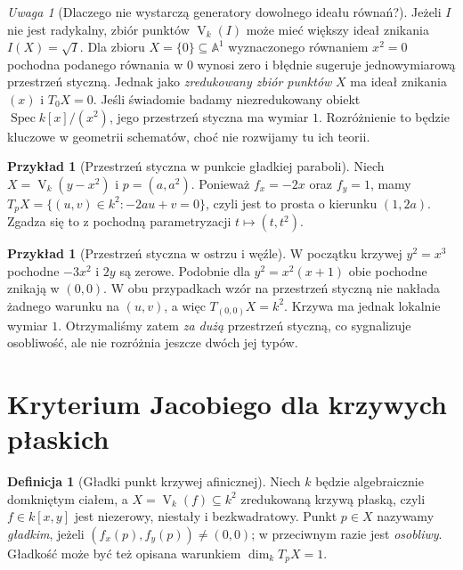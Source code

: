 \documentclass[11pt,a4paper,openany]{report}
\numberwithin{equation}{section}
\theoremstyle{plain}
\theoremstyle{definition}
\newtheorem{definicja}[twierdzenie]{Definicja}
\newtheorem{przyklad}[twierdzenie]{Przykład}
\theoremstyle{remark}
\newtheorem{uwaga}[twierdzenie]{Uwaga}
\newcommand{\A}{\mathbb A}
\newcommand{\V}{\operatorname V}
\begin{document}
\begin{uwaga}[Dlaczego nie wystarczą generatory dowolnego ideału równań?]
Jeżeli $I$ nie jest radykalny, zbiór punktów $\V_k(I)$
może mieć większy ideał znikania $I(X)=\sqrt I$.
Dla zbioru $X=\{0\}\subseteq\A^1$ wyznaczonego
równaniem $x^2=0$ pochodna podanego równania w $0$
wynosi zero i błędnie sugeruje jednowymiarową przestrzeń
styczną. Jednak jako \emph{zredukowany zbiór punktów}
$X$ ma ideał znikania $(x)$ i $T_0X=0$.
Jeśli świadomie badamy niezredukowany obiekt
$\operatorname{Spec}k[x]/(x^2)$, jego przestrzeń
styczna ma wymiar $1$. Rozróżnienie to będzie kluczowe
w geometrii schematów, choć nie rozwijamy tu ich teorii.
\end{uwaga}

\begin{przyklad}[Przestrzeń styczna w punkcie gładkiej paraboli]
Niech $X=\V_k(y-x^2)$ i $p=(a,a^2)$.
Ponieważ $f_x=-2x$ oraz $f_y=1$, mamy
$T_pX=\{(u,v)\in k^2:-2au+v=0\}$,
czyli jest to prosta o kierunku $(1,2a)$.
Zgadza się to z pochodną parametryzacji $t\mapsto(t,t^2)$.
\end{przyklad}

\begin{przyklad}[Przestrzeń styczna w ostrzu i węźle]
W początku krzywej $y^2=x^3$ pochodne $-3x^2$ i $2y$
są zerowe. Podobnie dla $y^2=x^2(x+1)$
obie pochodne znikają w $(0,0)$. W obu przypadkach
wzór na przestrzeń styczną nie nakłada żadnego warunku
na $(u,v)$, a więc $T_{(0,0)}X=k^2$.
Krzywa ma jednak lokalnie wymiar $1$. Otrzymaliśmy
zatem \emph{za dużą} przestrzeń styczną, co sygnalizuje
osobliwość, ale nie rozróżnia jeszcze dwóch jej typów.
\end{przyklad}

\section{Kryterium Jacobiego dla krzywych płaskich}

\begin{definicja}[Gładki punkt krzywej afinicznej]
\label{def:smooth-affine-curve}
Niech $k$ będzie algebraicznie domkniętym ciałem,
a $X=\V_k(f)\subseteq k^2$ zredukowaną krzywą płaską,
czyli $f\in k[x,y]$ jest niezerowy, niestały i bezkwadratowy.
Punkt $p\in X$ nazywamy \emph{gładkim}, jeżeli
$(f_x(p),f_y(p))\ne(0,0)$; w przeciwnym razie
jest \emph{osobliwy}. Gładkość może być też opisana
warunkiem $\dim_kT_pX=1$.
\end{definicja}
\end{document}
